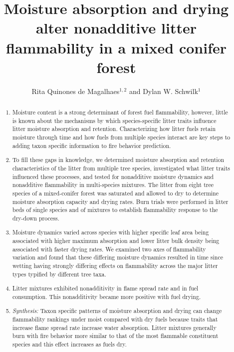 \documentclass[letterpaper,12pt]{article}
\title{Moisture absorption and drying alter nonadditive litter flammability
  in a mixed conifer forest}
\author{Rita Quinones de Magalhaes$^{1,2}$ and Dylan W. Schwilk$^1$}
\begin{document}
\maketitle

\begin{abstract}
  \noindent \begin{enumerate}
    
      \item Moisture content is a strong determinant of forest fuel
    flammability, however, little is known about the mechanisms by which
    species-specific litter traits influence litter moisture absorption and
    retention. Characterizing how litter fuels retain moisture through time and
    how fuels from multiple species interact are key steps to adding taxon
    specific information to fire behavior prediction.

      \item To fill these gaps in knowledge, we determined moisture absorption
    and retention characteristics of the litter from multiple tree species,
    investigated what litter traits influenced these processes, and tested for
    nonadditive moisture dynamics and nonadditive flammability in multi-species
    mixtures. The litter from eight tree species of a mixed-conifer forest was
    saturated and allowed to dry to determine moisture absorption capacity and
    drying rates. Burn trials were performed in litter beds of single species
    and of mixtures to establish flammability response to the dry-down process.
    
      \item Moisture dynamics varied across species with higher specific leaf
    area being associated with higher maximum absorption and lower litter bulk
    density being associated with faster drying rates. We examined two axes of
    flammability variation and found that these differing moisture dynamics
    resulted in time since wetting having strongly differing effects on
    flammability across the major litter types typified by different tree taxa.

      \item Litter mixtures exhibited nonadditivity in flame spread rate and
    in fuel consumption. This nonadditivity became more positive with fuel
    drying.
    
      \item \emph{Synthesis:} Taxon specific patterns of moisture absorption
    and drying can change flammability rankings under moist compared with dry
    fuels because traits that increase flame spread rate increase water
    absorption. Litter mixtures generally burn with fire behavior more similar
    to that of the most flammable constituent species and this effect increases
    as fuels dry.
    
  \end{enumerate}
\end{abstract}
\end{document}

